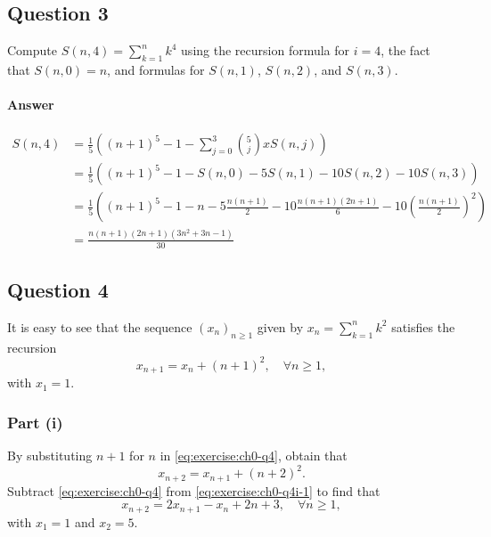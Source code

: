 \subsection{Question 3}
Compute $ S(n, 4) = \sum_{k=1}^{n} k^4 $ using the recursion formula for
    $ i = 4 $, the fact that $ S(n, 0) = n $, and formulas for $ S(n, 1) $,
    $ S(n, 2) $, and $ S(n, 3) $.

\paragraph{Answer}
\begin{align*}
    S(n, 4)
        &= \frac{1}{5} \left( (n + 1)^5 - 1 - \sum_{j=0}^{3} \binom{5}{j}x
            S(n, j) \right) \\
        &= \frac{1}{5} \left( (n + 1)^5 - 1 - S(n, 0) - 5 S(n, 1) -
            10 S(n, 2) - 10 S(n, 3) \right) \\
        &= \frac{1}{5} \left( (n + 1)^5 - 1 - n - 5 \frac{n (n + 1)}{2} -
            10 \frac{n (n + 1)(2 n + 1)}{6} - 10 \left( \frac{n (n + 1)}{2}
            \right)^2 \right) \\
        &= \frac{n (n + 1)(2 n + 1)(3 n^2 + 3 n - 1)}{30}
\end{align*}

\subsection{Question 4}
It is easy to see that the sequence $ (x_n)_{n \geq 1} $ given by
    $ x_n = \sum_{k=1}^{n} k^2 $ satisfies the recursion
\begin{equation}
    x_{n + 1} = x_n + (n + 1)^2, \quad \forall n \geq 1,
    \label{eq:exercise:ch0-q4}
\end{equation}
with $ x_1 = 1 $.

\subsubsection{Part (i)}
By substituting $ n + 1 $ for $ n $ in \eqref{eq:exercise:ch0-q4}, obtain that
\begin{equation}
    x_{n + 2} = x_{n + 1} + (n + 2)^2.
    \label{eq:exercise:ch0-q4i-1}
\end{equation}
Subtract \eqref{eq:exercise:ch0-q4} from \eqref{eq:exercise:ch0-q4i-1} to find
    that
\begin{equation}
    x_{n + 2} = 2 x_{n + 1} - x_n + 2 n + 3, \quad \forall n \geq 1,
    \label{eq:exercise:ch0-q4i-2}
\end{equation}
with $ x_1 = 1 $ and $ x_2 = 5 $.

